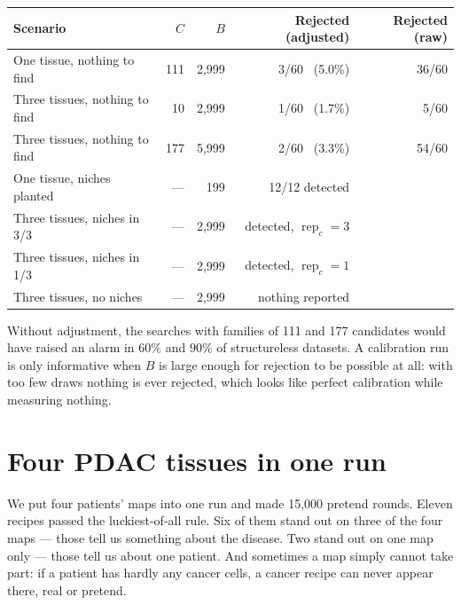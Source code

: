 \documentclass[11pt,a4paper]{article}
\theoremstyle{remark}
\newcommand{\rep}{\operatorname{rep}}
\begin{document}
\begin{center}
\small
\begin{tabular}{lrrrr}
\toprule
Scenario & $C$ & $B$ & Rejected (adjusted) & Rejected (raw) \\
\midrule
One tissue, nothing to find & 111 & 2{,}999 & 3/60 \ (5.0\%) & 36/60 \\
Three tissues, nothing to find & 10 & 2{,}999 & 1/60 \ (1.7\%) & 5/60 \\
Three tissues, nothing to find & 177 & 5{,}999 & 2/60 \ (3.3\%) & 54/60 \\
\midrule
One tissue, niches planted & --- & 199 & 12/12 detected & \\
Three tissues, niches in 3/3 & --- & 2{,}999 & detected, $\rep_c=3$ & \\
Three tissues, niches in 1/3 & --- & 2{,}999 & detected, $\rep_c=1$ & \\
Three tissues, no niches & --- & 2{,}999 & nothing reported & \\
\bottomrule
\end{tabular}
\end{center}

Without adjustment, the searches with families of 111 and 177 candidates would
have raised an alarm in $60\%$ and $90\%$ of structureless datasets. A
calibration run is only informative when $B$ is large enough for rejection to
be possible at all: with too few draws nothing is ever rejected, which looks
like perfect calibration while measuring nothing.

\section{Four PDAC tissues in one run}
\label{sec:real}

\begin{plain}
We put four patients' maps into one run and made 15{,}000 pretend rounds.
Eleven recipes passed the luckiest-of-all rule. Six of them stand out on three
of the four maps --- those tell us something about the disease. Two stand out
on one map only --- those tell us about one patient. And sometimes a
map simply cannot take part: if a patient has hardly any cancer cells, a
cancer recipe can never appear there, real or pretend.
\end{plain}
\end{document}
